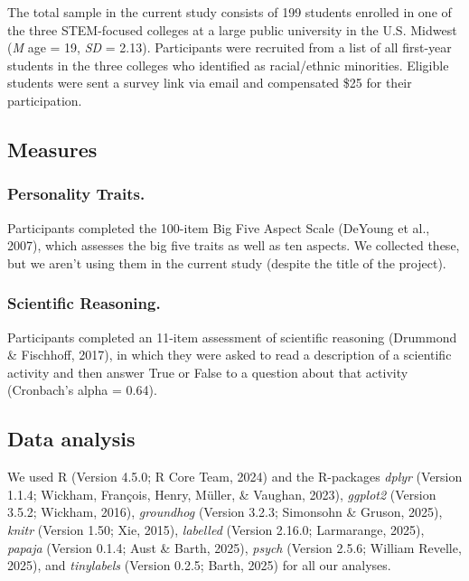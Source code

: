 \documentclass[
  english,
  man,floatsintext]{apa6}
\begin{document}
The total sample in the current study consists of 199 students enrolled in one of the three STEM-focused colleges at a large public university in the U.S. Midwest (\emph{M} age = 19, \emph{SD} = 2.13). Participants were recruited from a list of all first-year students in the three colleges who identified as racial/ethnic minorities. Eligible students were sent a survey link via email and compensated \$25 for their participation.

\subsection{Measures}\label{measures}

\subsubsection{Personality Traits.}\label{personality-traits.}

Participants completed the 100-item Big Five Aspect Scale (DeYoung et al., 2007), which assesses the big five traits as well as ten aspects. We collected these, but we aren't using them in the current study (despite the title of the project).

\subsubsection{Scientific Reasoning.}\label{scientific-reasoning.}

Participants completed an 11-item assessment of scientific reasoning (Drummond \& Fischhoff, 2017), in which they were asked to read a description of a scientific activity and then answer True or False to a question about that activity (Cronbach's alpha = 0.64).

\subsection{Data analysis}\label{data-analysis}

We used R (Version 4.5.0; R Core Team, 2024) and the R-packages \emph{dplyr} (Version 1.1.4; Wickham, François, Henry, Müller, \& Vaughan, 2023), \emph{ggplot2} (Version 3.5.2; Wickham, 2016), \emph{groundhog} (Version 3.2.3; Simonsohn \& Gruson, 2025), \emph{knitr} (Version 1.50; Xie, 2015), \emph{labelled} (Version 2.16.0; Larmarange, 2025), \emph{papaja} (Version 0.1.4; Aust \& Barth, 2025), \emph{psych} (Version 2.5.6; William Revelle, 2025), and \emph{tinylabels} (Version 0.2.5; Barth, 2025) for all our analyses.
\end{document}
